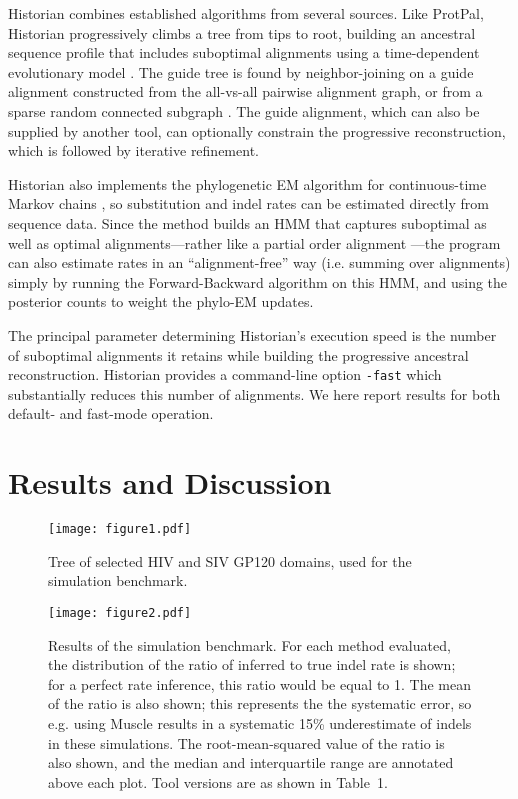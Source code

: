 Historian combines established algorithms from several sources.
Like ProtPal, Historian progressively climbs a tree from tips to root,
building an ancestral sequence profile that includes suboptimal alignments \citep{LeeGrassoSharlow2002,Westesson2012-zg}
using a time-dependent evolutionary model \citep{RivasEddy2015}.
The guide tree is found by neighbor-joining %
on a guide alignment constructed from the all-vs-all pairwise alignment graph,
or from a sparse random connected subgraph \citep{BradleyEtAl2009}.
The guide alignment, which can also be supplied by another tool,
can optionally constrain the progressive reconstruction,
which is followed by iterative refinement. %

Historian also implements the phylogenetic EM algorithm for continuous-time Markov chains \citep{HolmesRubin2002},
so substitution and indel rates can be estimated directly from sequence data.
Since the method builds an HMM that captures suboptimal as well as optimal alignments---rather
like a partial order alignment \citep{LeeGrassoSharlow2002}---the program
can also estimate rates in an ``alignment-free'' way (i.e. summing over alignments)
simply by running the Forward-Backward algorithm on this HMM,
and using the posterior counts to weight the phylo-EM updates.

The principal parameter determining Historian's execution speed is the number of suboptimal alignments
it retains while building the progressive ancestral reconstruction. Historian provides a command-line option {\tt -fast} which substantially reduces this number of alignments.
We here report results for both default- and fast-mode operation.


\section{Results and Discussion}

\begin{figure}
  \texttt{[image: figure1.pdf]}
  \caption{
    Tree of selected HIV and SIV GP120 domains, used for the simulation benchmark.
  }
\end{figure}

\begin{figure}
  \texttt{[image: figure2.pdf]}
  \caption{
    Results of the simulation benchmark.
    For each method evaluated, the distribution of the ratio of inferred to true
    indel rate is shown; for a perfect rate inference, this ratio would be equal to 1.
    The mean of the ratio is also shown; this represents the the systematic error,
    so e.g. using Muscle results in a systematic 15\% underestimate of indels
    in these simulations.
    The root-mean-squared value of the ratio is also shown,
    and the median and interquartile range are annotated above each plot.
    Tool versions are as shown in Table~1.
  }
\end{figure}

